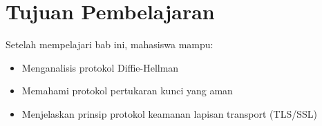 \section*{Tujuan Pembelajaran}
Setelah mempelajari bab ini, mahasiswa mampu:
\begin{itemize}
\item Menganalisis protokol Diffie-Hellman
\item Memahami protokol pertukaran kunci yang aman
\item Menjelaskan prinsip protokol keamanan lapisan transport (TLS/SSL)
\end{itemize}
